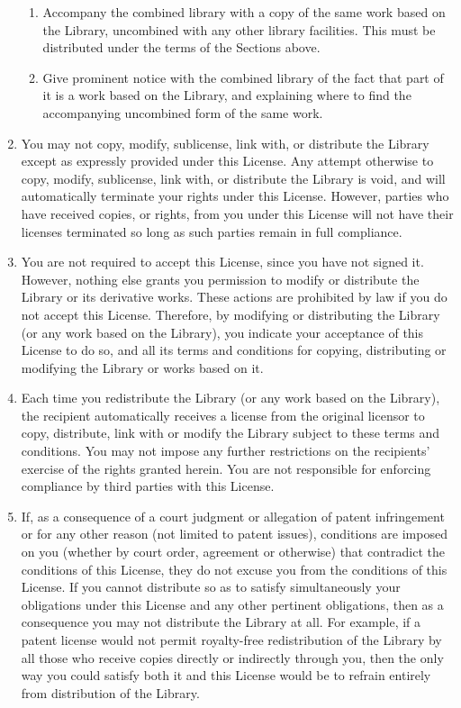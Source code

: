 \begin{enumerate}
\begin{enumerate}[a]
\item
Accompany the combined library with a copy of the same work
based on the Library, uncombined with any other library
facilities.  This must be distributed under the terms of the
Sections above.
\item
Give prominent notice with the combined library of the fact
that part of it is a work based on the Library, and explaining
where to find the accompanying uncombined form of the same work.
\end{enumerate}

\item
You may not copy, modify, sublicense, link with, or distribute
the Library except as expressly provided under this License.  Any
attempt otherwise to copy, modify, sublicense, link with, or
distribute the Library is void, and will automatically terminate your
rights under this License.  However, parties who have received copies,
or rights, from you under this License will not have their licenses
terminated so long as such parties remain in full compliance.

\item
You are not required to accept this License, since you have not
signed it.  However, nothing else grants you permission to modify or
distribute the Library or its derivative works.  These actions are
prohibited by law if you do not accept this License.  Therefore, by
modifying or distributing the Library (or any work based on the
Library), you indicate your acceptance of this License to do so, and
all its terms and conditions for copying, distributing or modifying
the Library or works based on it.

\item
Each time you redistribute the Library (or any work based on the
Library), the recipient automatically receives a license from the
original licensor to copy, distribute, link with or modify the Library
subject to these terms and conditions.  You may not impose any further
restrictions on the recipients' exercise of the rights granted herein.
You are not responsible for enforcing compliance by third parties with
this License.

\item
If, as a consequence of a court judgment or allegation of patent
infringement or for any other reason (not limited to patent issues),
conditions are imposed on you (whether by court order, agreement or
otherwise) that contradict the conditions of this License, they do not
excuse you from the conditions of this License.  If you cannot
distribute so as to satisfy simultaneously your obligations under this
License and any other pertinent obligations, then as a consequence you
may not distribute the Library at all.  For example, if a patent
license would not permit royalty-free redistribution of the Library by
all those who receive copies directly or indirectly through you, then
the only way you could satisfy both it and this License would be to
refrain entirely from distribution of the Library.


\end{enumerate}
